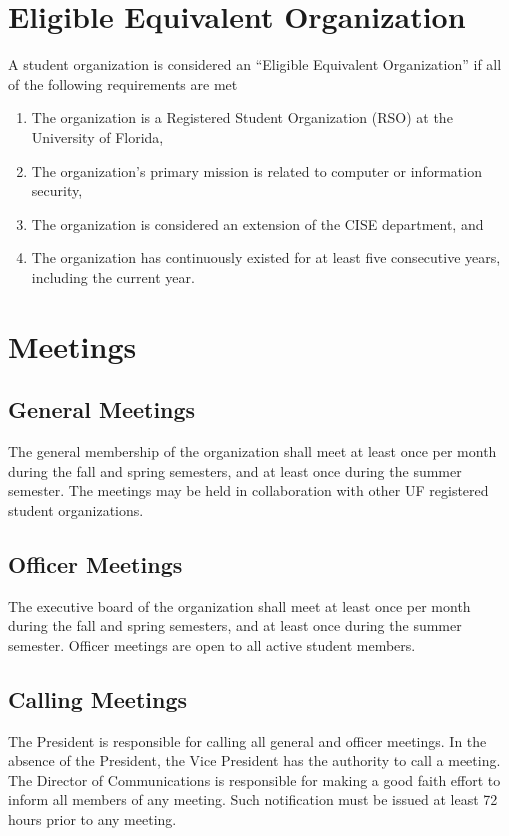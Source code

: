 \documentclass{article}
\begin{document}
\section{Eligible Equivalent Organization}
A student organization is considered an ``Eligible Equivalent Organization'' if all of the following requirements are met
\begin{enumerate}
	\item The organization is a Registered Student Organization (RSO) at the University of Florida,
	\item The organization's primary mission is related to computer or information security, 
	\item The organization is considered an extension of the CISE department, and
	\item The organization has continuously existed for at least five consecutive years, including the current year.
\end{enumerate}

\section{Meetings}
\subsection{General Meetings}
The general membership of the organization shall meet at least once per month during the fall and spring semesters, and at least once during the summer semester. The meetings may be held in collaboration with other UF registered student organizations.

\subsection{Officer Meetings}
The executive board of the organization shall meet at least once per month during the fall and spring semesters, and at least once during the summer semester. Officer meetings are open to all active student members.

\subsection{Calling Meetings}
The President is responsible for calling all general and officer meetings. In the absence of the President, the Vice President has the authority to call a meeting. The Director of Communications is responsible for making a good faith effort to inform all members of any meeting. Such notification must be issued at least 72 hours prior to any meeting.
\end{document}
